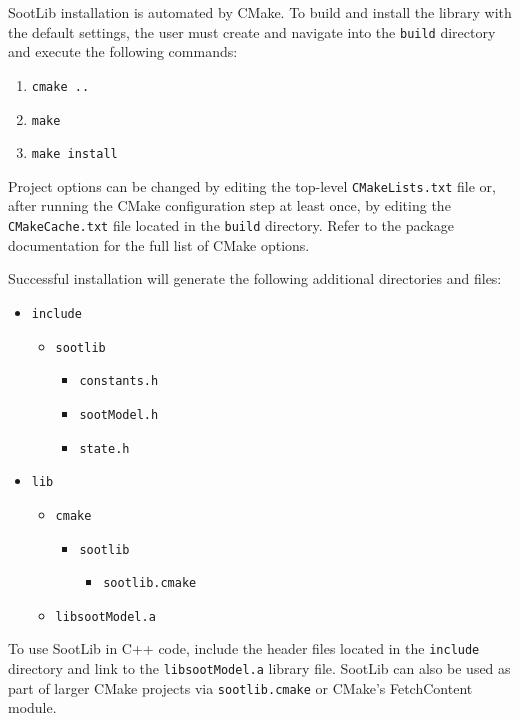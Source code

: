 \documentclass[preprint,letterpaper]{elsarticle}
\begin{document}
SootLib installation is automated by CMake. To build and install the library with the default settings, the user must create and navigate into the \texttt{build} directory and execute the following commands:
\begin{enumerate}
    \item \texttt{cmake ..}
    \item \texttt{make}
    \item \texttt{make install}
\end{enumerate}
Project options can be changed by editing the top-level \texttt{CMakeLists.txt} file or, after running the CMake configuration step at least once, by editing the \texttt{CMakeCache.txt} file located in the \texttt{build} directory. Refer to the package documentation for the full list of CMake options.

Successful installation will generate the following additional directories and files:
\begin{itemize}
    \item[\faFolderO] \texttt{include}
    \begin{itemize}
        \item[\faFolderO] \texttt{sootlib}
        \begin{itemize}
            \item[\faFileTextO] \texttt{constants.h}
            \item[\faFileTextO] \texttt{sootModel.h}
            \item[\faFileTextO] \texttt{state.h}
        \end{itemize}
    \end{itemize}
    \item[\faFolderO] \texttt{lib}
    \begin{itemize}
        \item[\faFolderO] \texttt{cmake}
        \begin{itemize}
            \item[\faFolderO] \texttt{sootlib}
            \begin{itemize}
                \item[\faFileCodeO] \texttt{sootlib.cmake}
            \end{itemize}
        \end{itemize}
        \item[\faFileCodeO] \texttt{libsootModel.a}
    \end{itemize}
\end{itemize}
To use SootLib in C++ code, include the header files located in the \texttt{include} directory and link to the \texttt{libsootModel.a} library file. SootLib can also be used as part of larger CMake projects via \texttt{sootlib.cmake} or CMake's FetchContent module.
\end{document}
